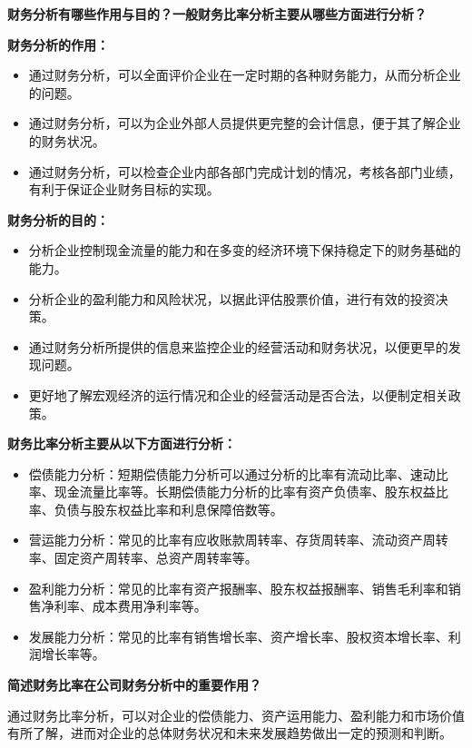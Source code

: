 \documentclass[
  10pt,
  twoside,
  openany,
  b5paper, %
  colorscheme = black, %
  xits = false,
]{qyxf-book}
\begin{document}
 \textbf{财务分析有哪些作用与目的？一般财务比率分析主要从哪些方面进行分析？}

\begin{note}
	\textbf{财务分析的作用：}
	\begin{itemize}
		\item 通过财务分析，可以全面评价企业在一定时期的各种财务能力，从而分析企业的问题。
		\item 通过财务分析，可以为企业外部人员提供更完整的会计信息，便于其了解企业的财务状况。
		\item 通过财务分析，可以检查企业内部各部门完成计划的情况，考核各部门业绩，有利于保证企业财务目标的实现。
	\end{itemize}
	
	\textbf{财务分析的目的：}
	\begin{itemize}
		\item 分析企业控制现金流量的能力和在多变的经济环境下保持稳定下的财务基础的能力。
		\item 分析企业的盈利能力和风险状况，以据此评估股票价值，进行有效的投资决策。
		\item 通过财务分析所提供的信息来监控企业的经营活动和财务状况，以便更早的发现问题。
		\item 更好地了解宏观经济的运行情况和企业的经营活动是否合法，以便制定相关政策。
	\end{itemize}
	
	\textbf{财务比率分析主要从以下方面进行分析：}
	\begin{itemize}
		\item 偿债能力分析：短期偿债能力分析可以通过分析的比率有流动比率、速动比率、现金流量比率等。长期偿债能力分析的比率有资产负债率、股东权益比率、负债与股东权益比率和利息保障倍数等。
		\item 营运能力分析：常见的比率有应收账款周转率、存货周转率、流动资产周转率、固定资产周转率、总资产周转率等。
		\item 盈利能力分析：常见的比率有资产报酬率、股东权益报酬率、销售毛利率和销售净利率、成本费用净利率等。
		\item 发展能力分析：常见的比率有销售增长率、资产增长率、股权资本增长率、利润增长率等。
	\end{itemize}
\end{note}

 \textbf{简述财务比率在公司财务分析中的重要作用？}
\begin{note}
	通过财务比率分析，可以对企业的偿债能力、资产运用能力、盈利能力和市场价值有所了解，进而对企业的总体财务状况和未来发展趋势做出一定的预测和判断。
\end{note}
\end{document}
